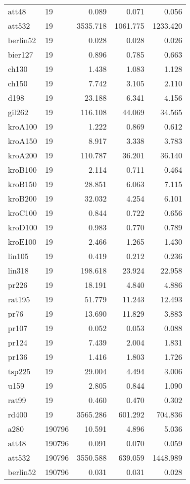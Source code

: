 \begin{center}
\begin{longtable}{llrrr}
att48  & 19 & 0.089 & 0.071 & 0.056\\
att532  & 19 & 3535.718 & 1061.775 & 1233.420\\
berlin52  & 19 & 0.028 & 0.028 & 0.026\\
bier127  & 19 & 0.896 & 0.785 & 0.663\\
ch130  & 19 & 1.438 & 1.083 & 1.128\\
ch150  & 19 & 7.742 & 3.105 & 2.110\\
d198  & 19 & 23.188 & 6.341 & 4.156\\
gil262  & 19 & 116.108 & 44.069 & 34.565\\
kroA100  & 19 & 1.222 & 0.869 & 0.612\\
kroA150  & 19 & 8.917 & 3.338 & 3.783\\
kroA200  & 19 & 110.787 & 36.201 & 36.140\\
kroB100  & 19 & 2.114 & 0.711 & 0.464\\
kroB150 & 19 & 28.851 & 6.063 & 7.115\\
kroB200  & 19 & 32.032 & 4.254 & 6.101\\
kroC100  & 19 & 0.844 & 0.722 & 0.656\\
kroD100  & 19 & 0.983 & 0.770 & 0.789\\
kroE100  & 19 & 2.466 & 1.265 & 1.430\\
lin105  & 19 & 0.419 & 0.212 & 0.236\\
lin318  & 19 & 198.618 & 23.924 & 22.958\\
pr226  & 19 & 18.191 & 4.840 & 4.886\\
rat195  & 19 & 51.779 & 11.243 & 12.493\\
pr76  & 19 & 13.690 & 11.829 & 3.883\\
pr107  & 19 & 0.052 & 0.053 & 0.088\\
pr124  & 19 & 7.439 & 2.004 & 1.831\\
pr136  & 19 & 1.416 & 1.803 & 1.726\\
tsp225  & 19 & 29.004 & 4.494 & 3.006\\
u159  & 19 & 2.805 & 0.844 & 1.090\\
rat99  & 19 & 0.460 & 0.470 & 0.302\\
rd400  & 19 & 3565.286 & 601.292 & 704.836\\
a280 & 190796 & 10.591 & 4.896 & 5.036\\
att48  & 190796 & 0.091 & 0.070 & 0.059\\
att532  & 190796 & 3550.588 & 639.059 & 1448.989\\
berlin52  & 190796 & 0.031 & 0.031 & 0.028\\

\end{longtable}
\end{center}

